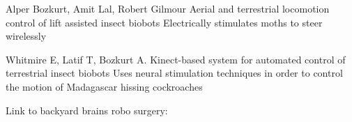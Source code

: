 Alper Bozkurt, Amit Lal, Robert Gilmour
Aerial and terrestrial locomotion control of lift assisted insect biobots
Electrically stimulates moths to steer wirelessly

Whitmire E, Latif T, Bozkurt A.
Kinect-based system for automated control of terrestrial insect biobots
Uses neural stimulation techniques in order to control the motion of Madagascar hissing cockroaches

Link to backyard brains robo surgery: %

